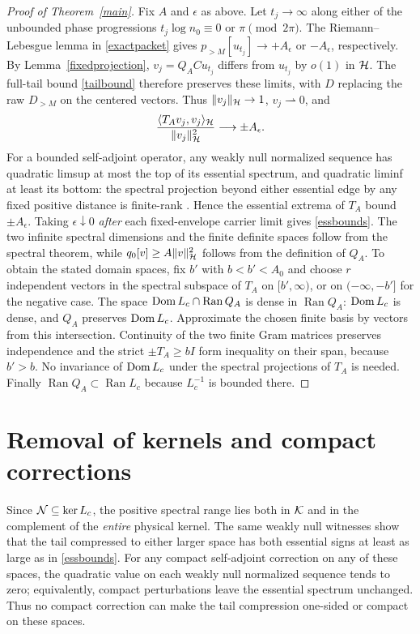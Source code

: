 \documentclass[11pt]{article}
\begin{document}
\begin{proof}[Proof of Theorem~\ref{main}]
Fix $A$ and $\epsilon$ as above. Let $t_j\to\infty$ along either of the unbounded phase progressions $t_j\log n_0\equiv0$ or $\pi\pmod{2\pi}$. The Riemann--Lebesgue lemma in \eqref{exactpacket} gives $p_{>M}[u_{t_j}]\to+A_\epsilon$ or $-A_\epsilon$, respectively. By Lemma~\ref{fixedprojection}, $v_j=Q_A C u_{t_j}$ differs from $u_{t_j}$ by $o(1)$ in $\mathcal H$. The full-tail bound \eqref{tailbound} therefore preserves these limits, with $D$ replacing the raw $D_{>M}$ on the centered vectors. Thus $\lVert v_j\rVert_{\mathcal H}\to1$, $v_j\rightharpoonup0$, and
\[\frac{\langle T_Av_j,v_j\rangle_{\mathcal H}}{\lVert v_j\rVert_{\mathcal H}^2}\longrightarrow\pm A_\epsilon.
\]
For a bounded self-adjoint operator, any weakly null normalized sequence has quadratic limsup at most the top of its essential spectrum, and quadratic liminf at least its bottom: the spectral projection beyond either essential edge by any fixed positive distance is finite-rank \cite{reed}. Hence the essential extrema of $T_A$ bound $\pm A_\epsilon$. Taking $\epsilon\downarrow0$ \emph{after} each fixed-envelope carrier limit gives \eqref{essbounds}. The two infinite spectral dimensions and the finite definite spaces follow from the spectral theorem, while $q_0[v]\ge A\lVert v\rVert_{\mathcal H}^2$ follows from the definition of $Q_A$. To obtain the stated domain spaces, fix $b'$ with $b<b'<A_0$ and choose $r$ independent vectors in the spectral subspace of $T_A$ on $[b',\infty)$, or on $(-\infty,-b']$ for the negative case. The space $\operatorname{Dom} L_c\cap\operatorname{Ran}Q_A$ is dense in $\operatorname{Ran}Q_A$: $\operatorname{Dom} L_c$ is dense, and $Q_A$ preserves $\operatorname{Dom} L_c$. Approximate the chosen finite basis by vectors from this intersection. Continuity of the two finite Gram matrices preserves independence and the strict $\pm T_A\ge bI$ form inequality on their span, because $b'>b$. No invariance of $\operatorname{Dom} L_c$ under the spectral projections of $T_A$ is needed. Finally $\operatorname{Ran}Q_A\subset\operatorname{Ran}L_c$ because $L_c^{-1}$ is bounded there.
\end{proof}

\section{Removal of kernels and compact corrections}\label{scope}
Since $\mathcal N\subseteq\ker L_c$, the positive spectral range lies both in $\mathcal K$ and in the complement of the \emph{entire} physical kernel. The same weakly null witnesses show that the tail compressed to either larger space has both essential signs at least as large as in \eqref{essbounds}. For any compact self-adjoint correction on any of these spaces, the quadratic value on each weakly null normalized sequence tends to zero; equivalently, compact perturbations leave the essential spectrum unchanged. Thus no compact correction can make the tail compression one-sided or compact on these spaces.
\end{document}
